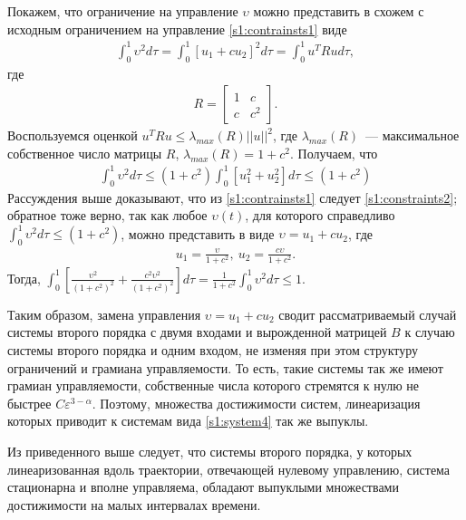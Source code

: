 \documentclass[../main.tex]{subfiles}
\begin{document}
 
Покажем, что ограничение на управление $ \upsilon $ можно представить в схожем с исходным ограничением на управление \eqref{s1:contrainsts1} виде
\begin{gather*}
 \int_{0}^{1} \upsilon ^2 d \tau = \int_{0}^{1} \left[ u_1 + c u_2 \right]^2 d \tau = \int_{0}^{1} u^T R u d \tau,
\end{gather*}
где 
\begin{gather*}
 R = \left[ \begin{array}{cc}
 1 & c \\ 
 c & c^2
 \end{array} \right].
\end{gather*}
Воспользуемся оценкой $
u^T R u \leqslant \lambda_{max}(R) || u ||^2 $, где $ \lambda_{max}(R) $~--- максимальное собственное число матрицы $ R $, $ \lambda_{max}(R) = 1 + c^2 $.
Получаем, что
\begin{gather}\label{s1:constraints2}
 \int_{0}^{1} \upsilon ^2 d \tau \leqslant (1 + c^2) \int_{0}^{1} \left[ u_1^2 + u_2^2 \right] d \tau \leqslant (1 + c^2)
\end{gather}
Рассуждения выше доказывают, что из \eqref{s1:contrainsts1} следует \eqref{s1:constraints2}; обратное тоже верно, так как любое $ \upsilon(t) $, для которого справедливо $ \int_{0}^{1} \upsilon ^2 d \tau \leqslant (1 + c^2) $, можно представить в виде $ \upsilon = u_1 + c u_2 $, где 
\begin{gather*}
 u_1 = \frac{\upsilon}{1+c^2}, \ u_2 = \frac{c \upsilon}{1+c^2}.
\end{gather*}
Тогда, $ \int_0^1 \left[ \frac{\upsilon^2}{(1+c^2)^2} + \frac{c^2 \upsilon^2}{(1+c^2)^2}\right] d \tau = \frac{1}{1+c^2} \int_{0}^{1} \upsilon ^2 d \tau \leqslant 1 $. 
 
Таким образом, замена управления $ \upsilon = u_1 + c u_2 $ сводит рассматриваемый случай системы второго порядка с двумя входами и вырожденной матрицей $ B $ к случаю системы второго порядка и одним входом, не изменяя при этом структуру ограничений и грамиана управляемости.
То есть, такие системы так же имеют грамиан управляемости, собственные числа которого стремятся к нулю не быстрее $ C \varepsilon^{3-\alpha} $.
Поэтому, множества достижимости систем, линеаризация которых приводит к системам вида \eqref{s1:system4} так же выпуклы.
 
Из приведенного выше следует, что системы второго порядка, у которых линеаризованная вдоль траектории, отвечающей нулевому управлению, система стационарна и вполне управляема, обладают выпуклыми множествами достижимости на малых интервалах времени.
\end{document}

